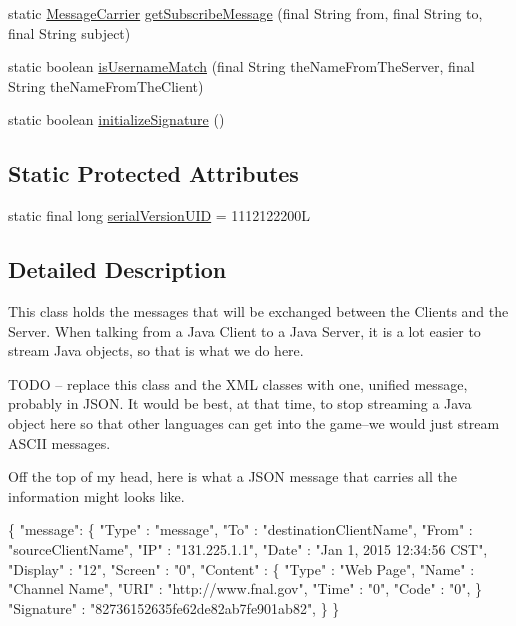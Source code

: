 \begin{DoxyCompactItemize}
\item 
static \hyperlink{classgov_1_1fnal_1_1ppd_1_1ZZattic_1_1MessageCarrier}{Message\-Carrier} \hyperlink{classgov_1_1fnal_1_1ppd_1_1ZZattic_1_1MessageCarrier_a586e9b5efc107c371d7dca8295577fcc}{get\-Subscribe\-Message} (final String from, final String to, final String subject)
\item 
static boolean \hyperlink{classgov_1_1fnal_1_1ppd_1_1ZZattic_1_1MessageCarrier_a605f24a95d6bd8bd5537401c8df3e849}{is\-Username\-Match} (final String the\-Name\-From\-The\-Server, final String the\-Name\-From\-The\-Client)
\item 
static boolean \hyperlink{classgov_1_1fnal_1_1ppd_1_1ZZattic_1_1MessageCarrier_a7f557da468c7a4c3e60ab76447ee0132}{initialize\-Signature} ()
\end{DoxyCompactItemize}
\subsection*{Static Protected Attributes}
\begin{DoxyCompactItemize}
\item 
static final long \hyperlink{classgov_1_1fnal_1_1ppd_1_1ZZattic_1_1MessageCarrier_ad53d90e55cdc6a470cf2ee8a715017e1}{serial\-Version\-U\-I\-D} = 1112122200\-L
\end{DoxyCompactItemize}


\subsection{Detailed Description}
This class holds the messages that will be exchanged between the Clients and the Server. When talking from a Java Client to a Java Server, it is a lot easier to stream Java objects, so that is what we do here.

T\-O\-D\-O -- replace this class and the X\-M\-L classes with one, unified message, probably in J\-S\-O\-N. It would be best, at that time, to stop streaming a Java object here so that other languages can get into the game--we would just stream A\-S\-C\-I\-I messages.

Off the top of my head, here is what a J\-S\-O\-N message that carries all the information might looks like.


\begin{DoxyPre}
\{ "message": \{
    "Type"    : "message",
    "To"      : "destinationClientName",
    "From"    : "sourceClientName",
    "IP"      : "131.225.1.1",
    "Date"    : "Jan 1, 2015 12:34:56 CST",
    "Display" : "12",
    "Screen"  : "0",
    "Content" : \{
            "Type" : "Web Page",
         "Name" : "Channel Name",
         "URI"  : "http://www.fnal.gov",
         "Time" : "0",
         "Code" : "0",         
    \}
    "Signature" : "82736152635fe62de82ab7fe901ab82",
  \}
\}
\end{DoxyPre}


